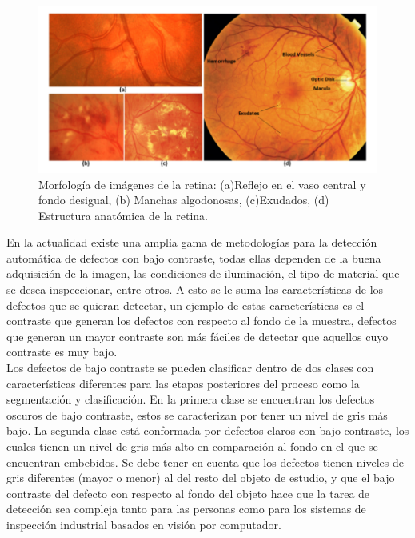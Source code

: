 \begin{figure}[H]
	{
	\centering
	\includegraphics[width=1\textwidth]{Figures/image_ojo}
	\caption[Imagenes de Fondo de ojo]{Morfolog\'ia de im\'agenes de la retina: (a)Reflejo en el vaso central y fondo desigual, (b) Manchas algodonosas, (c)Exudados, (d) Estructura anat\'omica de la retina.}
	\label{fig:Fondo_de_ojo}
	}
\end{figure}	

En la actualidad existe una  amplia gama de metodologías para la detección automática de defectos  con  bajo contraste, todas ellas dependen de la buena adquisici\'on de la imagen, las condiciones de iluminaci\'on, el tipo de material que se desea inspeccionar, entre otros. A esto se le suma las características de los defectos que se quieran detectar, un ejemplo de estas características es el contraste que generan los defectos con respecto al fondo de la muestra, defectos que generan un mayor contraste son más fáciles de detectar que aquellos cuyo 
contraste es muy bajo.\\
Los defectos de bajo contraste se pueden clasificar dentro de dos clases con características diferentes para las etapas posteriores del proceso como la segmentación y clasificación. En la primera clase se encuentran los defectos oscuros de bajo contraste, estos se caracterizan por tener un nivel de gris más bajo. La segunda clase está conformada por defectos claros con bajo contraste, los cuales tienen un nivel de gris más alto 
en comparación al fondo en el que se encuentran embebidos. Se debe tener en cuenta que los defectos tienen niveles de gris diferentes (mayor o menor) al del resto del objeto de estudio, y  que el bajo contraste del defecto con respecto al  fondo del objeto  hace que la tarea de detección sea compleja tanto para las personas como para los sistemas de inspección industrial basados en visión por computador.\\

